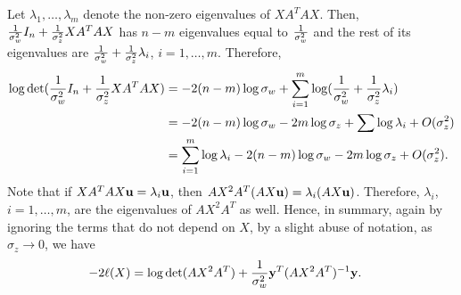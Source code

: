 \documentclass[onecolumn]{IEEEtran}
\begin{document}
Let $\lambda_1,\ldots,\lambda_m$ denote the non-zero eigenvalues of $XA^TAX$. Then, ${1\over \sigma_w^2}I_n+ {1\over \sigma_z^2}XA^TAX$ has $n-m$ eigenvalues equal to ${1\over \sigma_w^2}$ and the rest of its eigenvalues are ${1\over \sigma_w^2}+{1\over \sigma_z^2}\lambda_i$, $i=1,\ldots,m$.
Therefore,
\begin{align}
\log\det({1\over \sigma_w^2}I_n+ {1\over \sigma_z^2}XA^TAX)
&=-2(n-m)\log  \sigma_w+\sum_{i=1}^m\log({1\over \sigma_w^2}+{1\over \sigma_z^2}\lambda_i)\nonumber\\
&=-2(n-m)\log  \sigma_w-2m\log\sigma_z+\sum\log\lambda_i+O(\sigma_z^2)\nonumber\\
&=\sum_{i=1}^m\log\lambda_i-2(n-m)\log  \sigma_w-2m\log\sigma_z+O(\sigma_z^2).
\end{align}
Note that if $XA^TAX{\bf u}=\lambda_i{\bf u}$, then $AX^2A^T(AX{\bf u})=\lambda_i(AX{\bf u})$. Therefore, $\lambda_i$, $i=1,\ldots,m$, are the eigenvalues of $AX^2A^T$ as well. Hence, in summary, again by ignoring the terms that do not depend on $X$, by a slight abuse of  notation, as $\sigma_z\to 0$, we have
\begin{align}
-2\ell(X)&=\log\det(AX^2A^T)+{1\over \sigma_w^2}{\bf y}^T(AX^2A^T)^{-1}{\bf y}.
\end{align}
\end{document}
